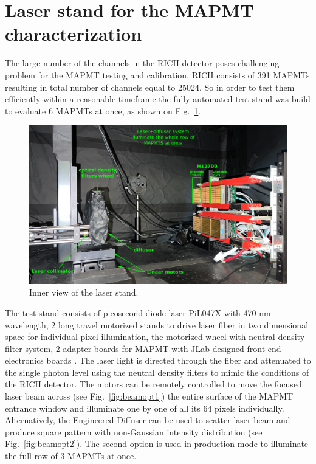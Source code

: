 
\section{Laser stand for the MAPMT characterization}
The large number of the channels in the RICH detector  poses challenging problem for the MAPMT testing and calibration.
RICH consists of 391 MAPMTs resulting in total number of channels equal to 25024. So in order to test them efficiently within a reasonable timeframe the fully automated test stand was build to evaluate 6 MAPMTs at once, as shown on Fig.~\ref{fig:MAPMTtest}.

\begin{figure}[hbt]
	\centering
	\includegraphics[width=0.9\linewidth]{figures/LaserSetup.png}
	\caption{Inner view of the laser stand.}
	\label{fig:MAPMTtest}
\end{figure}

The test stand consists of picosecond diode  laser PiL047X with 470 nm wavelength, 2 long travel motorized stands to drive laser fiber in two dimensional space for individual pixel illumination, the motorized wheel with neutral density filter system, 2 adapter boards for MAPMT with JLab designed front-end electronics boards \cite{Contalbrigo:2020}.
The laser light is directed through the fiber and attenuated to the single photon level using the neutral density filters to mimic the conditions of the RICH detector.
The motors can be remotely controlled to move the focused laser beam across (see Fig.~\ref{fig:beamopt1}) the entire surface of the MAPMT entrance window and illuminate one by one of all its 64 pixels individually.
Alternatively, the Engineered Diffuser can be used to scatter laser beam and produce square pattern with non-Gaussian intensity distribution (see Fig.~\ref{fig:beamopt2}). 
The second option is used in production mode to illuminate the full row of 3 MAPMTs at once.

